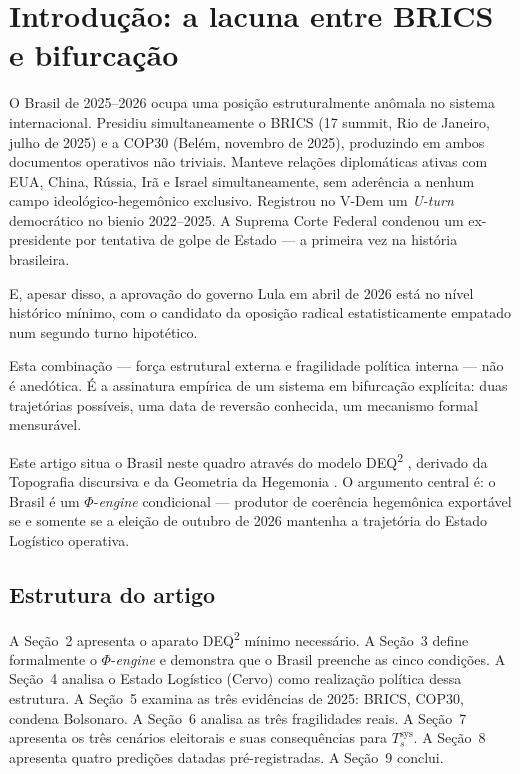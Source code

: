 \documentclass[12pt]{article}
\theoremstyle{definition}
\theoremstyle{remark}
\begin{document}
\clearpage

\section{Introdu\c{c}\~{a}o: a lacuna entre BRICS e bifurca\c{c}\~{a}o}

O Brasil de 2025--2026 ocupa uma posi\c{c}\~{a}o estruturalmente an\^{o}mala no sistema internacional. Presidiu simultaneamente o BRICS (17\textdegree{} summit, Rio de Janeiro, julho de 2025) e a COP30 (Bel\'{e}m, novembro de 2025), produzindo em ambos documentos operativos n\~{a}o triviais. Manteve rela\c{c}\~{o}es diplom\'{a}ticas ativas com EUA, China, R\'{u}ssia, Ir\~{a} e Israel simultaneamente, sem ader\^{e}ncia a nenhum campo ideol\'{o}gico-hegemônico exclusivo. Registrou no V-Dem um \textit{U-turn} democr\'{a}tico no bienio 2022--2025. A Suprema Corte Federal condenou um ex-presidente por tentativa de golpe de Estado --- a primeira vez na hist\'{o}ria brasileira.

E, apesar disso, a aprova\c{c}\~{a}o do governo Lula em abril de 2026 est\'{a} no n\'{i}vel hist\'{o}rico m\'{i}nimo, com o candidato da oposi\c{c}\~{a}o radical estatisticamente empatado num segundo turno hipot\'{e}tico.

Esta combina\c{c}\~{a}o --- for\c{c}a estrutural externa e fragilidade pol\'{i}tica interna --- n\~{a}o \'{e} anedótica. \'{E} a assinatura emp\'{i}rica de um sistema em bifurca\c{c}\~{a}o expl\'{i}cita: duas trajet\'{o}rias poss\'{i}veis, uma data de revers\~{a}o conhecida, um mecanismo formal mensur\'{a}vel.

Este artigo situa o Brasil neste quadro atrav\'{e}s do modelo DEQ\textsuperscript{2} \citep{marcelino2026c}, derivado da Topografia discursiva \citep{marcelino2026a} e da Geometria da Hegemonia \citep{marcelino2026b}. O argumento central \'{e}: o Brasil \'{e} um \(\Phi\)-\textit{engine} condicional --- produtor de coer\^{e}ncia hegem\^{o}nica exportável se e somente se a elei\c{c}\~{a}o de outubro de 2026 mantenha a trajet\'{o}ria do Estado Log\'{i}stico operativa.

\subsection{Estrutura do artigo}

A Se\c{c}\~{a}o~2 apresenta o aparato DEQ\textsuperscript{2} m\'{i}nimo necess\'{a}rio. A Se\c{c}\~{a}o~3 define formalmente o \(\Phi\)-\textit{engine} e demonstra que o Brasil preenche as cinco condi\c{c}\~{o}es. A Se\c{c}\~{a}o~4 analisa o Estado Log\'{i}stico (Cervo) como realiza\c{c}\~{a}o pol\'{i}tica dessa estrutura. A Se\c{c}\~{a}o~5 examina as tr\^{e}s evidências de 2025: BRICS, COP30, condena Bolsonaro. A Se\c{c}\~{a}o~6 analisa as tr\^{e}s fragilidades reais. A Se\c{c}\~{a}o~7 apresenta os tr\^{e}s cen\'{a}rios eleitorais e suas consequ\^{e}ncias para \(T_s^{\text{sys}}\). A Se\c{c}\~{a}o~8 apresenta quatro predi\c{c}\~{o}es datadas pr\'{e}-registradas. A Se\c{c}\~{a}o~9 conclui.
\end{document}
